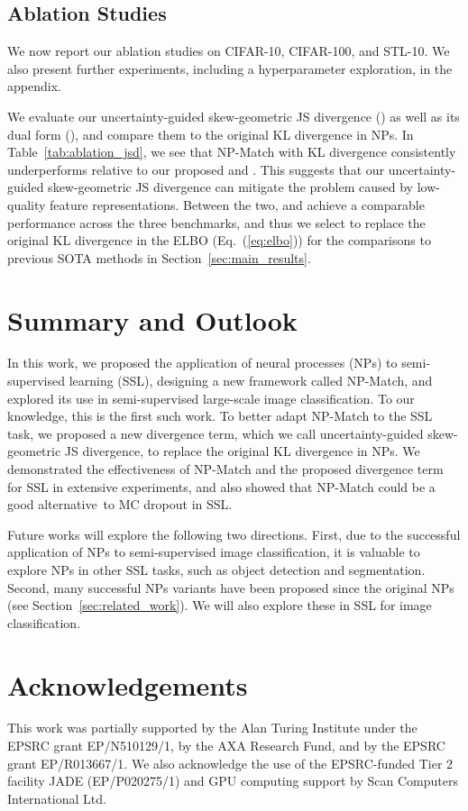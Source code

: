 \documentclass[nohyperref]{article}
\theoremstyle{plain}
\theoremstyle{definition}
\theoremstyle{remark}
\begin{document}
 \subsection{Ablation Studies}
We now report our ablation studies on CIFAR-10, CIFAR-100, and STL-10. We also present further experiments, including a hyperparameter exploration, in the appendix.

We evaluate our uncertainty-guided skew-geometric JS divergence () as well as its dual form (), and compare them to the original KL divergence in NPs. In Table~\ref{tab:ablation_jsd}, we see that NP-Match with KL divergence consistently underperforms relative to our proposed  and . This suggests that our uncertainty-guided skew-geometric JS divergence can mitigate the problem caused by low-quality feature representations. Between the two,  and  achieve a comparable performance across the three benchmarks, and thus  we select  to replace the original KL divergence in the ELBO (Eq.~(\ref{eq:elbo})) for the comparisons to previous SOTA methods in Section~\ref{sec:main_results}. 

 
 
\section{Summary and Outlook}
\label{sec:conclusion}
In this work, we proposed the application of neural processes (NPs) to semi-supervised learning (SSL), designing a new framework called NP-Match, and explored its use in semi-supervised large-scale image classification. 
To our knowledge, this is the first such work. To better adapt NP-Match to the SSL task, we proposed a new divergence term, which we call uncertainty-guided skew-geometric JS divergence, to replace the original  KL divergence in NPs. We demonstrated the effectiveness of NP-Match and the proposed divergence term for SSL in extensive experiments, and also showed that NP-Match could be a good alternative~to MC dropout in SSL. 

Future works will explore the following two directions.
First, due to the successful application of NPs to semi-supervised image classification, it is valuable to explore NPs in other SSL tasks, such as object detection and segmentation.
Second, many successful NPs variants have been proposed since the original NPs \cite{garnelo2018neural} (see Section~\ref{sec:related_work}). We will  also explore these in SSL for image classification. 

\section{Acknowledgements}
This work was partially supported by the Alan Turing Institute under the EPSRC grant EP/N510129/1, by the AXA Research Fund, and by the EPSRC grant EP/R013667/1. We also acknowledge the use of the EPSRC-funded Tier 2 facility JADE (EP/P020275/1) and GPU computing support by Scan Computers International Ltd.
\end{document}
